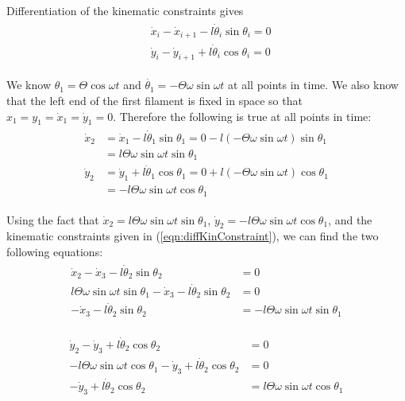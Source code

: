 \documentclass[12pt,letterpaper,titlepage]{article}
\begin{document}
Differentiation of the kinematic constraints gives
\begin{align} \label{eqn:diffKinConstraint}
\begin{split}
& \dot{x}_i - \dot{x}_{i+1} - l \dot{\theta}_i \sin \theta_i = 0 \\
& \dot{y}_i - \dot{y}_{i+1} + l \dot{\theta}_i \cos \theta_i = 0
\end{split}
\end{align}

We know $\theta_1 = \Theta \cos \omega t$ and $\dot{\theta_1} = - \Theta \omega \sin \omega t$ at all points in time. We also know that the left end of the first filament is fixed in space so that $x_1 = y_1 = \dot{x}_1 = \dot{y}_1 = 0$. Therefore the following is true at all points in time:
\begin{align} \label{eqn:xydot2}
\begin{split}
\dot{x}_{2} &= \dot{x}_1 - l \dot{\theta}_1 \sin \theta_1 = 0 - l (- \Theta \omega \sin \omega t) \sin \theta_1 \\
&= l \Theta \omega \sin \omega t \sin \theta_1\\
\dot{y}_{2} &= \dot{y}_1 + l \dot{\theta}_1 \cos \theta_1 = 0 + l (- \Theta \omega \sin \omega t) \cos \theta_1\\
&= - l \Theta \omega \sin \omega t \cos \theta_1
\end{split}
\end{align}

Using the fact that $\dot{x}_{2} = l \Theta \omega \sin \omega t \sin \theta_1$, $\dot{y}_{2} = - l \Theta \omega \sin \omega t \cos \theta_1$, and the kinematic constraints given in (\ref{eqn:diffKinConstraint}), we can find the two following equations:
\begin{align}
\begin{split}
\dot{x}_{2} - \dot{x}_{3} - l \dot{\theta}_2 \sin \theta_2 &= 0\\
l \Theta \omega \sin \omega t \sin \theta_1 - \dot{x}_{3} - l \dot{\theta}_2 \sin \theta_2 &= 0\\
- \dot{x}_{3} - l \dot{\theta}_2 \sin \theta_2 &= - l \Theta \omega \sin \omega t \sin \theta_1
\end{split}
\end{align}

\begin{align}
\begin{split}
\dot{y}_{2} - \dot{y}_{3} + l \dot{\theta}_2 \cos \theta_2 &= 0\\
- l \Theta \omega \sin \omega t \cos \theta_1 - \dot{y}_{3} + l \dot{\theta}_2 \cos \theta_2 &= 0\\
- \dot{y}_{3} + l \dot{\theta}_2 \cos \theta_2 &= l \Theta \omega \sin \omega t \cos \theta_1
\end{split}
\end{align}
\end{document}
